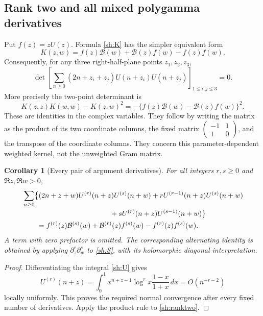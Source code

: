 \documentclass[11pt,letterpaper]{article}
\numberwithin{equation}{section}
\newtheorem{corollary}[theorem]{Corollary}
\theoremstyle{definition}
\theoremstyle{remark}
\newcommand{\Bcal}{\mathcal B}
\begin{document}
\subsection{Rank two and all mixed polygamma derivatives}

Put $f(z)=zU(z)$. Formula \eqref{sh:K} has the simpler equivalent form
\begin{equation}\label{sh:ranktwo}
 K(z,w)=f(z)\Bcal(w)+\Bcal(z)f(w)-f(z)f(w).
\end{equation}
Consequently, for any three right-half-plane points $z_1,z_2,z_3$,
\begin{equation}\label{sh:det3}
 \det\left[
 \sum_{n\ge0}(2n+z_i+z_j)U(n+z_i)U(n+z_j)
                  \right]_{1\le i,j\le3}=0.
\end{equation}
More precisely the two-point determinant is
\begin{equation}\label{sh:det2}
 K(z,z)K(w,w)-K(z,w)^2
       =-\{f(z)\Bcal(w)-\Bcal(z)f(w)\}^2.
\end{equation}
These are identities in the complex variables. They follow by writing
the matrix as the product of its two coordinate columns, the fixed
matrix $\left(\begin{smallmatrix}-1&1\\1&0\end{smallmatrix}\right)$,
and the transpose of the coordinate columns. They concern this
parameter-dependent weighted kernel, not the unweighted Gram matrix.

\begin{corollary}[Every pair of argument derivatives]
\label{sh:mixed}
For all integers $r,s\ge0$ and $\Re z,\Re w>0$,
\begin{align}\label{sh:mixed-formula}
 &\sum_{n\ge0}\bigl\{
 (2n+z+w)U^{(r)}(n+z)U^{(s)}(n+w)
 +rU^{(r-1)}(n+z)U^{(s)}(n+w)\notag\\[-2pt]
 &\hspace{43mm}
 +sU^{(r)}(n+z)U^{(s-1)}(n+w)\bigr\}\notag\\
 &\qquad=f^{(r)}(z)\Bcal^{(s)}(w)
       +\Bcal^{(r)}(z)f^{(s)}(w)-f^{(r)}(z)f^{(s)}(w).
\end{align}
A term with zero prefactor is omitted. The corresponding alternating
identity is obtained by applying $\partial_z^r\partial_w^s$ to
\eqref{sh:S}, with its holomorphic diagonal interpretation.
\end{corollary}

\begin{proof}
Differentiating the integral \eqref{sh:U} gives
\[
 U^{(r)}(n+z)=\int_0^1x^{n+z-1}\log^r x\frac{1-x}{1+x}\,dx
                  =O(n^{-r-2})
\]
locally uniformly. This proves the required normal convergence
after every fixed number of derivatives. Apply the product rule to
\eqref{sh:ranktwo}.
\end{proof}
\end{document}
